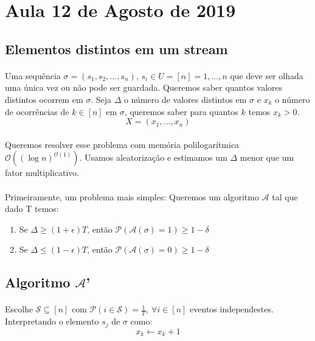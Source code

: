 


\section{Aula 12 de Agosto de 2019}
\label{2019_08_12}
\subsection{Elementos distintos em um stream}
\paragraph{} Uma sequência $\sigma = (s_1, s_2, ..., s_n)$, $s_i \in U = [n] = {1, ..., n}$ que deve ser olhada uma única vez ou não pode ser guardada. Queremos saber quantos valores distintos ocorrem em $\sigma$. Seja $\Delta$ o número de valores distintos em $\sigma$ e $x_k$ o número de ocorrências de $k \in [n]$ em $\sigma$, queremos saber para quantos $k$ temos $x_k>0$.
$$X = (x_1, ..., x_n)$$
\paragraph{} Queremos resolver esse problema com memória polilogarítmica $\mathcal{O}((\log{}n)^{\mathcal{O}(1)})$. Usamos aleatorização e estimamos um $\Delta$ menor que um fator multiplicativo.
\paragraph{}Primeiramente, um problema mais simples: Queremos um algoritmo $\mathcal{A}$ tal que dado T temos:
\begin{enumerate}
    \centering
    \item Se $\Delta \geq (1+\epsilon)T$, então $\mathcal{P}(\mathcal{A}(\sigma) = 1) \geq 1 - \delta$
    \item Se $\Delta \leq (1-\epsilon)T$, então $\mathcal{P}(\mathcal{A}(\sigma) = 0) \geq 1 - \delta$
\end{enumerate}

\subsection{Algoritmo $\mathcal{A}$'}
\paragraph{} Escolhe $\mathcal{S} \subseteq [n]$ com $\mathcal{P}( i \in \mathcal{S}) = \frac{1}{T},\ \forall i \in [n]$ eventos independestes. Interpretando o elemento $s_j$ de $\sigma$ como:
$$x_k \leftarrow x_k + 1$$
